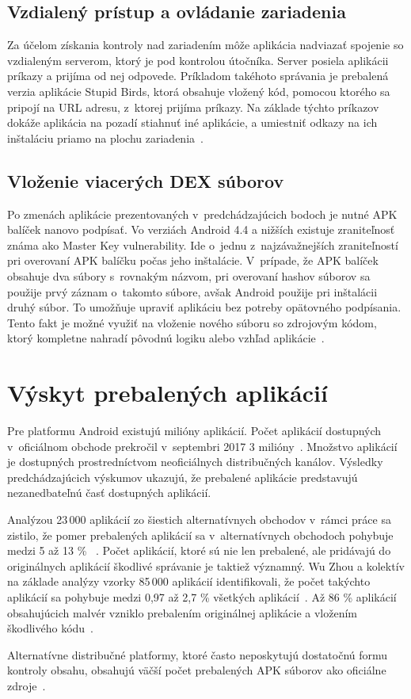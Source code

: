 \subsection*{Vzdialený prístup a ovládanie zariadenia}
Za účelom získania kontroly nad zariadením môže aplikácia nadviazať spojenie so vzdialeným serverom, ktorý je pod kontrolou útočníka. Server posiela aplikácii príkazy a prijíma od nej odpovede. Príkladom takéhoto správania je prebalená verzia aplikácie Stupid Birds, ktorá obsahuje vložený kód, pomocou ktorého sa pripojí na URL adresu, z~ktorej prijíma príkazy. Na základe týchto príkazov dokáže aplikácia na pozadí stiahnuť iné aplikácie, a umiestniť odkazy na ich inštaláciu priamo na plochu zariadenia~\cite{fakeapps}. 

\subsection*{Vloženie viacerých DEX súborov}
Po zmenách aplikácie prezentovaných v~predchádzajúcich bodoch je nutné APK balíček nanovo podpísať. Vo verziách Android 4.4 a nižších existuje zraniteľnosť známa ako Master Key vulnerability. Ide o~jednu z~najzávažnejších zraniteľností pri overovaní APK balíčku počas jeho inštalácie. V~prípade, že APK balíček obsahuje dva súbory s~rovnakým názvom, pri overovaní hashov súborov sa použije prvý záznam o~takomto súbore, avšak Android použije pri inštalácii druhý súbor. To umožňuje upraviť aplikáciu bez potreby opätovného podpísania. Tento fakt je možné využiť na vloženie nového súboru so zdrojovým kódom, ktorý kompletne nahradí pôvodnú logiku alebo vzhľad aplikácie~\cite{Jung2013,c2gYRVCI9leJhfOJ}.

\section{Výskyt prebalených aplikácií}
Pre platformu Android existujú milióny aplikácií. Počet aplikácií dostupných v~oficiálnom obchode  prekročil v~septembri 2017 3 milióny~\cite{Statista}. Množstvo aplikácií je dostupných prostredníctvom neoficiálnych distribučných kanálov.  Výsledky predchádzajúcich výskumov ukazujú, že prebalené aplikácie predstavujú nezanedbateľnú časť dostupných aplikácií.

Analýzou 23\,000 aplikácií zo šiestich alternatívnych obchodov v~rámci práce  sa zistilo, že pomer prebalených aplikácií sa v~alternatívnych obchodoch pohybuje medzi 5 až 13 \% ~\cite{DetectingRepackagedZhou}.
Počet aplikácií, ktoré sú nie len prebalené, ale pridávajú do originálnych aplikácií škodlivé správanie je taktiež významný. Wu Zhou a kolektív na základe analýzy vzorky 85\,000 aplikácií identifikovali, že počet takýchto aplikácií sa pohybuje medzi 0,97 až 2,7 \% všetkých aplikácií~\cite{Zhou2013}.
Až 86 \% aplikácií obsahujúcich malvér vzniklo prebalením originálnej aplikácie a vložením škodlivého kódu~\cite{androidThreats}.

Alternatívne distribučné platformy, ktoré často neposkytujú dostatočnú formu kontroly obsahu, obsahujú väčší počet prebalených APK súborov ako oficiálne zdroje~\cite{Zhauniarovich2013}. 
